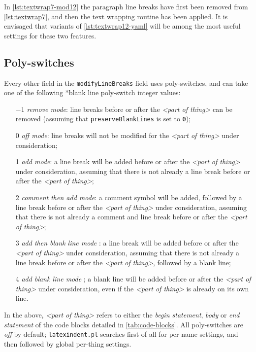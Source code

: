 	In \cref{lst:textwrap7-mod12} the paragraph line breaks have first been removed from
	\cref{lst:textwrap7}, and then the text wrapping routine has been applied. It is
	envisaged that variants of \cref{lst:textwrap12-yaml} will be among the most useful
	settings for these two features.

\subsection{Poly-switches}\label{sec:poly-switches}
	Every other field in the \texttt{modifyLineBreaks} field uses poly-switches, and can
	take one of the following%
	*{blank line poly-switch} integer values:
	\begin{itemize}[font=\bfseries]
		\item[$-1$] \emph{remove mode}: line breaks before or after the
		      \emph{<part of thing>} can be removed (assuming that \texttt{preserveBlankLines} is
		      set to \texttt{0});
		\item[0] \emph{off mode}: line breaks will not be modified for the
		      \emph{<part of thing>} under consideration;
		\item[1] \emph{add mode}: a line break will be added before or after the
		      \emph{<part of thing>} under consideration, assuming that
		      there is not already a line break before or after the \emph{<part of thing>};
		\item[2] \emph{comment then add mode}: a comment symbol will be added, followed by a line break
		      before or after the \emph{<part of thing>} under consideration, assuming that there
		      is not already a comment and line break before or after the \emph{<part of thing>};
		\item[3] \emph{add then blank line mode}%
		      : a line break will be added before or after the
		      \emph{<part of thing>} under consideration, assuming that
		      there is not already a line break before or after the \emph{<part of thing>},
		      followed by a blank line;
		\item[4] \emph{add blank line mode}%
		      ; a blank line will
		      be added before or after the \emph{<part of thing>} under consideration, even if the
		      \emph{<part of thing>} is already on its own line.
	\end{itemize}
	In the above, \emph{<part of thing>} refers to either the
	\emph{begin statement}, \emph{body} or \emph{end statement}
	of the code blocks detailed in \vref{tab:code-blocks}. All poly-switches are
	\emph{off} by default; \texttt{latexindent.pl} searches first of all
	for per-name settings, and then followed by global per-thing settings.

